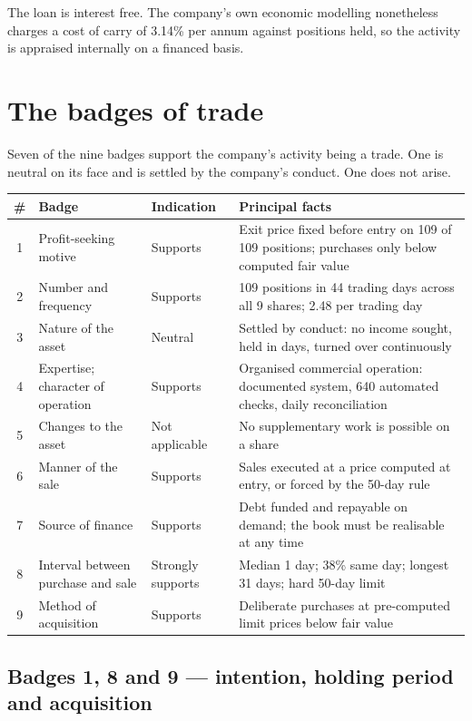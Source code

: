 \documentclass[11pt]{article}
\begin{document}
The loan is interest free. The company's own economic modelling nonetheless charges a cost of
carry of 3.14\% per annum against positions held, so the activity is appraised internally on a
financed basis.

\section{The badges of trade}

Seven of the nine badges support the company's activity being a trade. One is neutral on its face
and is settled by the company's conduct. One does not arise.

\begin{center}
\footnotesize
\begin{tabular}{@{}c l l p{6.4cm}@{}}
\toprule
\textbf{\#} & \textbf{Badge} & \textbf{Indication} & \textbf{Principal facts} \\
\midrule
1 & Profit-seeking motive & Supports & Exit price fixed before entry on 109 of 109 positions;
    purchases only below computed fair value \\
2 & Number and frequency & Supports & 109 positions in 44 trading days across all 9 shares;
    2.48 per trading day \\
3 & Nature of the asset & Neutral & Settled by conduct: no income sought, held in days, turned
    over continuously \\
4 & Expertise; character of operation & Supports & Organised commercial operation: documented
    system, 640 automated checks, daily reconciliation \\
5 & Changes to the asset & Not applicable & No supplementary work is possible on a share \\
6 & Manner of the sale & Supports & Sales executed at a price computed at entry, or forced by the
    50-day rule \\
7 & Source of finance & Supports & Debt funded and repayable on demand; the book must be
    realisable at any time \\
8 & Interval between purchase and sale & Strongly supports & Median 1 day; 38\% same day; longest
    31 days; hard 50-day limit \\
9 & Method of acquisition & Supports & Deliberate purchases at pre-computed limit prices below
    fair value \\
\bottomrule
\end{tabular}
\end{center}

\subsection{Badges 1, 8 and 9 --- intention, holding period and acquisition}
\end{document}
